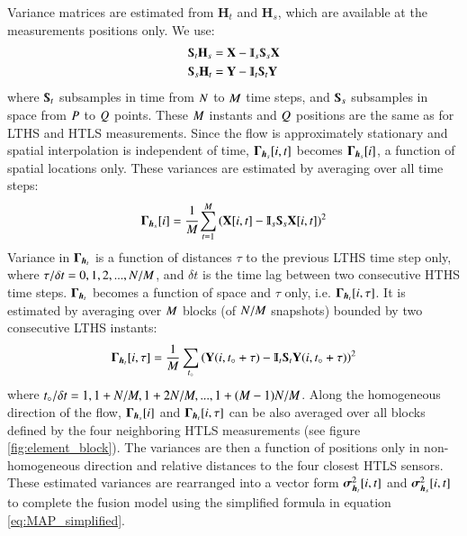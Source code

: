 Variance matrices are estimated from $ \mathbf{H}_t $ and $ \mathbf{H}_s $, which are available at the measurements positions only. We use:
\begin{align}
	\Sub_t\mathbf{H}_s &= \X- \Interp_s\Sub_s\X \\
	\Sub_s\mathbf{H}_t &= \Y- \Interp_t\Sub_t\Y
\end{align}
where $ \Sub_t $ subsamples in time from $ N  $ to $ M  $ time steps, and $ \Sub_s $ subsamples in space from $ P $ to $ Q $ points. These $ M  $ instants and $ Q $ positions are the same as for LTHS and HTLS measurements. Since the flow is approximately stationary and spatial interpolation is independent of time, $ \mathbf{\Gamma}_{\operatorname{\boldsymbol{h}}_s} [i,t] $ becomes $ \mathbf{\Gamma}_{\operatorname{\boldsymbol{h}}_s} [i] $, a function of spatial locations only. These variances are estimated by averaging over all time steps:
\begin{equation}
	\mathbf{\Gamma}_{\h_s} [i] = \cfrac{1}{\dimtl }\sum_{t=1}^{\dimtl } \left( \X[i,t]- \Interp_s\Sub_s\X[i,t] \right)^2 
	\label{eq:variance_estimation_1}
\end{equation}
Variance in $ \mathbf{\Gamma}_{\operatorname{\boldsymbol{h}}_t}$ is a function of distances $ \tau $ to the previous LTHS time step only, where $ \tau/\delta t=0,1,2,...,N/M $, and $ \delta t $ is the time lag between two consecutive HTHS time steps. $ \mathbf{\Gamma}_{\operatorname{\boldsymbol{h}}_t} $ becomes a function of space and $ \tau $ only, i.e. $ \mathbf{\Gamma}_{\operatorname{\boldsymbol{h}}_t} [i,\tau] $. It is estimated by averaging over $ M $  blocks (of $ N/M $ snapshots) bounded by two consecutive LTHS instants: 
\begin{equation}
	\mathbf{\Gamma}_{\h_t} [i,\tau] = \frac{1}{\dimtl}\sum_{t_\knot}\left( \Y(i,t_\knot+\tau)- \Interp_t\Sub_t\Y(i,t_\knot+\tau)\right)^2
	\label{eq:variance_estimation_2}
\end{equation}
where $ t_{\circ}/\delta t=1,1+N/M,1+2N/M,...,1+(M -1)N/M $. Along the homogeneous direction of the flow, $ \mathbf{\Gamma}_{\operatorname{\boldsymbol{h}}_s} [i] $ and $ \mathbf{\Gamma}_{\operatorname{\boldsymbol{h}}_t} [i,\tau] $ can be also averaged over all blocks defined by the four neighboring HTLS measurements (see figure \ref{fig:element_block}). The variances are then a function of positions only in non-homogeneous direction and relative distances to the four closest HTLS sensors. These estimated variances are rearranged into a vector form $\operatorname{\boldsymbol{\sigma}}^2_{\operatorname{\boldsymbol{h}}_t}[i,t] $ and $\operatorname{\boldsymbol{\sigma}}^2_{\operatorname{\boldsymbol{h}}_s}[i,t] $ to complete the fusion model using the simplified formula in equation \ref{eq:MAP_simplified}.

